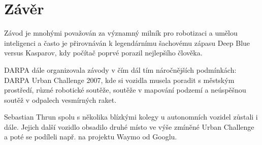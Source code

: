 \documentclass[12pt]{article}
\begin{document}
\section{Závěr}
Závod je mnohými považován za významný milník pro robotizaci a umělou inteligenci a často je přirovnáván
k legendárnímu šachovému zápasu Deep Blue versus Kasparov, kdy počítač poprvé porazil nejlepšího člověka. 

DARPA dále organizovala závody v čím dál tím náročnějších podmínkách: DARPA Urban Challenge 2007,
kde si vozidla musela poradit s městským prostředí, různé robotické soutěže, soutěže v mapování podzemí
a neúspěšnou soutěž v odpalech vesmírných raket.

Sebastian Thrun spolu s několika blízkými kolegy u autonomních vozidel zůstali i dále. Jejich další vozidlo
 obsadilo druhé místo ve výše zmíněné Urban Challenge a poté se podíleli např. na projektu Waymo
od Googlu. 
\end{document}
